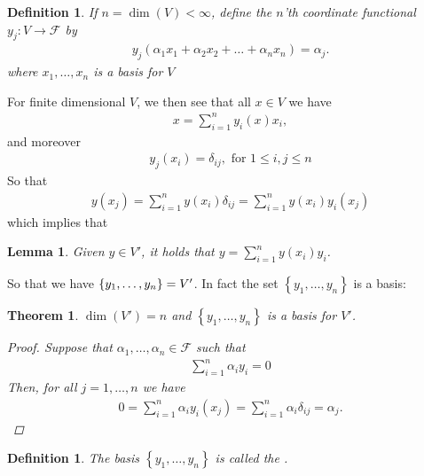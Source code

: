 \documentclass[10pt,twoside,openany,final]{memoir}
\theoremstyle{break}
\newtheorem{theorem}[section]{Theorem}
\newtheorem{lemma}[section]{Lemma}
\newtheorem{definition}[section]{Definition}
\theoremstyle{Break}
\newcommand{\F}{\mathcal{F}}
\let\Span\relax
\DeclareMathOperator{\Span}{Span}
\let\emph\relax
\begin{document}
\begin{definition}
	If $n=\dim(V) < \infty$, define the $n$'th coordinate functional $y_j \colon V \to \F$ by
	\begin{align*}
		y_j (\alpha_1 x_1+ \alpha_2 x_2+\dots+\alpha_n x_n)=\alpha_j.
	\end{align*}
	where $x_1,\dots,x_n$ is a basis for $V$
\end{definition}
For finite dimensional $V$, we then see that all $x \in V$ we have
\begin{align*}
	x=\sum_{i=1}^n y_i(x) x_i,
\end{align*}
and moreover
\begin{align*}
	y_j(x_i)=\delta_{ij}, \text{ for } 1 \leq i,j \leq n
\end{align*}
So that 
\begin{align*}
	y(x_j)=\sum_{i=1}^n y(x_i) \delta_{ij}=\sum_{i=1}^n y(x_i)y_i(x_j)
\end{align*}
which implies that
\begin{lemma}
	Given $y \in V'$, it holds that $y=\sum_{i=1}^n y(x_i)y_i$.
\end{lemma}
So that we have $\Span\left\{ y_1,\dots,y_n \right\}=V'$. In fact the set $\left\{ y_1,\dots,y_n \right\}$ is a basis:
\begin{theorem}
	$\dim(V')=n$ and $\left\{ y_1,\dots,y_n \right\}$ is a basis for $V'$.
	\begin{proof}
		Suppose that $\alpha_1,\dots,\alpha_n \in \F$ such that
		\begin{align*}
			\sum_{i=1}^n \alpha_{i}y_{i}=0
		\end{align*}
		Then, for all $j = 1,\dots,n$ we have
		\begin{align*}
			0=\sum_{i=1}^n \alpha_i y_i(x_j)=\sum_{i=1}^n \alpha_i \delta_{ij} = \alpha_j.
		\end{align*}
	\end{proof}
\end{theorem}

\begin{definition}
	The basis $\left\{ y_1,\dots,y_n \right\}$ is called the \emph{dual basis}.
\end{definition}
\end{document}
